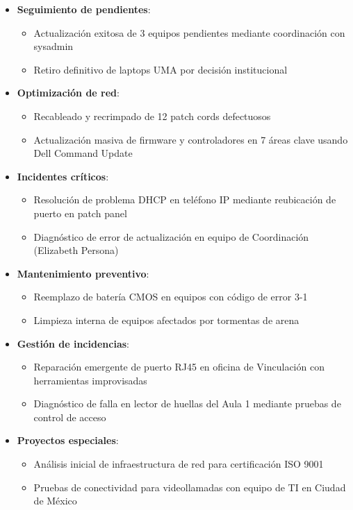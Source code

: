 \begin{itemize}
	\item \textbf{Seguimiento de pendientes}:
	\begin{itemize}
		\item Actualización exitosa de 3 equipos pendientes mediante coordinación con sysadmin
		\item Retiro definitivo de laptops UMA por decisión institucional
	\end{itemize}
	
	\item \textbf{Optimización de red}:
	\begin{itemize}
		\item Recableado y recrimpado de 12 patch cords defectuosos
		\item Actualización masiva de firmware y controladores en 7 áreas clave usando Dell Command Update
	\end{itemize}
	
	\item \textbf{Incidentes críticos}:
	\begin{itemize}
		\item Resolución de problema DHCP en teléfono IP mediante reubicación de puerto en patch panel
		\item Diagnóstico de error de actualización en equipo de Coordinación (Elizabeth Persona)
	\end{itemize}
\end{itemize}

\begin{itemize}
	\item \textbf{Mantenimiento preventivo}:
	\begin{itemize}
		\item Reemplazo de batería CMOS en equipos con código de error 3-1
		\item Limpieza interna de equipos afectados por tormentas de arena
	\end{itemize}
	
	\item \textbf{Gestión de incidencias}:
	\begin{itemize}
		\item Reparación emergente de puerto RJ45 en oficina de Vinculación con herramientas improvisadas
		\item Diagnóstico de falla en lector de huellas del Aula 1 mediante pruebas de control de acceso
	\end{itemize}
	
	\item \textbf{Proyectos especiales}:
	\begin{itemize}
		\item Análisis inicial de infraestructura de red para certificación ISO 9001
		\item Pruebas de conectividad para videollamadas con equipo de TI en Ciudad de México
	\end{itemize}
\end{itemize}

